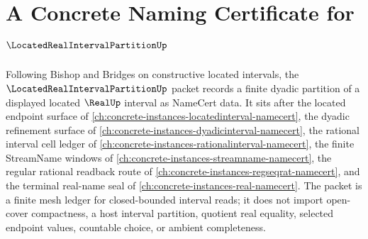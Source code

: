 \chapter{A Concrete Naming Certificate for $\LocatedRealIntervalPartitionUp$}
\label{ch:concrete-instances-located-real-interval-partition-namecert}

Following Bishop and Bridges on constructive located intervals, the $\LocatedRealIntervalPartitionUp$ packet records a finite dyadic partition of a displayed located $\RealUp$ interval as NameCert data. It sits after the located endpoint surface of \autoref{ch:concrete-instances-locatedinterval-namecert}, the dyadic refinement surface of \autoref{ch:concrete-instances-dyadicinterval-namecert}, the rational interval cell ledger of \autoref{ch:concrete-instances-rationalinterval-namecert}, the finite StreamName windows of \autoref{ch:concrete-instances-streamname-namecert}, the regular rational readback route of \autoref{ch:concrete-instances-regseqrat-namecert}, and the terminal real-name seal of \autoref{ch:concrete-instances-real-namecert}. The packet is a finite mesh ledger for closed-bounded interval reads; it does not import open-cover compactness, a host interval partition, quotient real equality, selected endpoint values, countable choice, or ambient completeness.

